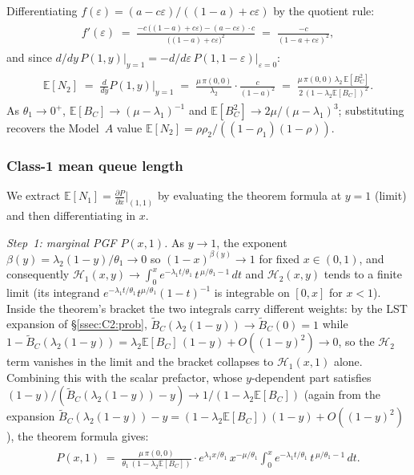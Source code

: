 Differentiating $f(\varepsilon)=(a-c\varepsilon)/((1-a)+c\varepsilon)$ by the quotient rule:
\begin{align}
    \begin{split}
        f'(\varepsilon)
        \;=\; \frac{-c\,\bigl((1-a)+c\varepsilon\bigr)-(a-c\varepsilon)\cdot c}{\bigl((1-a)+c\varepsilon\bigr)^2}
        \;=\; \frac{-c}{(1-a+c\varepsilon)^2},
    \end{split}
\end{align}
and since $d/dy\,P(1,y)\big|_{y=1}=-d/d\varepsilon\,P(1,1-\varepsilon)\big|_{\varepsilon=0}$:
\begin{align}
    \begin{split}
        \mathbb{E}[N_2]
        \;=\; \frac{d}{dy}P(1,y)\bigg|_{y=1}
        \;=\; \frac{\mu\,\pi(0,0)}{\lambda_2}\cdot\frac{c}{(1-a)^2}
        \;=\; \frac{\mu\,\pi(0,0)\,\lambda_2\,\mathbb{E}[B_C^2]}{2\,(1-\lambda_2\mathbb{E}[B_C])^2}.
    \end{split}
    \label{eq:C2:EN2}
\end{align}
As $\theta_1\to0^+$, $\mathbb{E}[B_C]\to(\mu-\lambda_1)^{-1}$ and
$\mathbb{E}[B_C^2]\to2\mu/(\mu-\lambda_1)^3$; substituting recovers the
Model~$A$ value $\mathbb{E}[N_2]=\rho\rho_2/((1-\rho_1)(1-\rho))$.

\subsubsection*{Class-1 mean queue length}

We extract $\mathbb{E}[N_1]=\tfrac{\partial P}{\partial x}\big|_{(1,1)}$ by evaluating
the theorem formula at $y=1$ (limit) and then differentiating in $x$.

\medskip\noindent\textit{Step~1: marginal PGF $P(x,1)$.}\enspace
As $y\to1$, the exponent $\beta(y)=\lambda_2(1-y)/\theta_1\to0$ so
$(1-x)^{\beta(y)}\to1$ for fixed $x\in(0,1)$, and consequently
$\mathcal{H}_1(x,y)\to\int_0^x e^{-\lambda_1 t/\theta_1}\,t^{\,\mu/\theta_1-1}\,dt$
and $\mathcal{H}_2(x,y)$ tends to a finite limit (its integrand
$e^{-\lambda_1 t/\theta_1}t^{\mu/\theta_1}(1-t)^{-1}$ is integrable on $[0,x]$ for
$x<1$).  Inside the theorem's bracket the two integrals carry different weights:
by the LST expansion of \S\ref{ssec:C2:prob},
$\widetilde{B}_C(\lambda_2(1-y))\to\widetilde{B}_C(0)=1$ while
$1-\widetilde{B}_C(\lambda_2(1-y))=\lambda_2\mathbb{E}[B_C]\,(1-y)+O((1-y)^2)\to0$,
so the $\mathcal{H}_2$ term vanishes in the limit and the bracket collapses to
$\mathcal{H}_1(x,1)$ alone.  Combining this with the scalar prefactor, whose
$y$-dependent part satisfies
$(1-y)/({\widetilde{B}_C(\lambda_2(1-y))-y})\to1/(1-\lambda_2\mathbb{E}[B_C])$
(again from the expansion $\widetilde{B}_C(\lambda_2(1-y))-y=(1-\lambda_2\mathbb{E}[B_C])(1-y)+O((1-y)^2)$),
the theorem formula gives:
\begin{align}
    \begin{split}
        P(x,1)
        \;=\; \frac{\mu\,\pi(0,0)}{\theta_1\,(1-\lambda_2\mathbb{E}[B_C])}
        \cdot e^{\lambda_1 x/\theta_1}\,x^{-\mu/\theta_1}
        \int_0^x e^{-\lambda_1 t/\theta_1}\,t^{\,\mu/\theta_1-1}\,dt.
    \end{split}
    \label{eq:C2:Px1}
\end{align}

